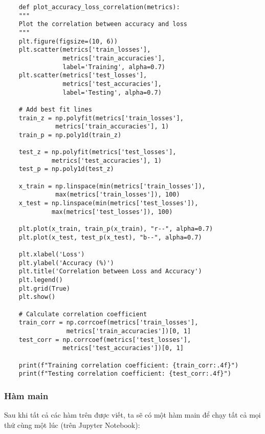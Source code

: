 \documentclass[../main.tex]{subfiles}
\begin{document}
\begin{verbatim}
    def plot_accuracy_loss_correlation(metrics):
    """
    Plot the correlation between accuracy and loss
    """
    plt.figure(figsize=(10, 6))
    plt.scatter(metrics['train_losses'], 
                metrics['train_accuracies'], 
                label='Training', alpha=0.7)
    plt.scatter(metrics['test_losses'], 
                metrics['test_accuracies'], 
                label='Testing', alpha=0.7)
    
    # Add best fit lines
    train_z = np.polyfit(metrics['train_losses'], 
              metrics['train_accuracies'], 1)
    train_p = np.poly1d(train_z)
    
    test_z = np.polyfit(metrics['test_losses'], 
             metrics['test_accuracies'], 1)
    test_p = np.poly1d(test_z)
    
    x_train = np.linspace(min(metrics['train_losses']), 
              max(metrics['train_losses']), 100)
    x_test = np.linspace(min(metrics['test_losses']), 
             max(metrics['test_losses']), 100)
    
    plt.plot(x_train, train_p(x_train), "r--", alpha=0.7)
    plt.plot(x_test, test_p(x_test), "b--", alpha=0.7)
    
    plt.xlabel('Loss')
    plt.ylabel('Accuracy (%)')
    plt.title('Correlation between Loss and Accuracy')
    plt.legend()
    plt.grid(True)
    plt.show()
    
    # Calculate correlation coefficient
    train_corr = np.corrcoef(metrics['train_losses'], 
                 metrics['train_accuracies'])[0, 1]
    test_corr = np.corrcoef(metrics['test_losses'], 
                metrics['test_accuracies'])[0, 1]
    
    print(f"Training correlation coefficient: {train_corr:.4f}")
    print(f"Testing correlation coefficient: {test_corr:.4f}")
\end{verbatim}

\subsubsection*{Hàm main}

Sau khi tất cả các hàm trên được viết, ta sẽ có một hàm main để chạy tất cả mọi thứ cùng một lúc (trên Jupyter Notebook):
\end{document}
